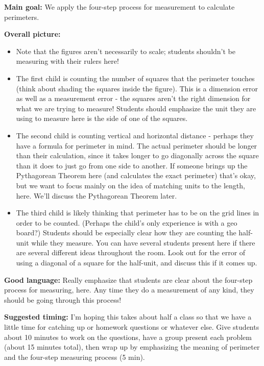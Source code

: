 \documentclass{ximera}
\begin{document}
\begin{instructorNotes}

{\bf Main goal:} We apply the four-step process for measurement to calculate perimeters.

{\bf Overall picture:} 
\begin{itemize}
	\item Note that the figures aren't necessarily to scale; students shouldn't be measuring with their rulers here!
	\item The first child is counting the number of squares that the perimeter touches (think about shading the squares inside the figure). This is a dimension error as well as a measurement error - the squares aren't the right dimension for what we are trying to measure! Students should emphasize the unit they are using to measure here is the side of one of the squares.
	\item The second child is counting vertical and horizontal distance - perhaps they have a formula for perimeter in mind. The actual perimeter should be longer than their calculation, since it takes longer to go diagonally across the square than it does to just go from one side to another. If someone brings up the Pythagorean Theorem here (and calculates the exact perimeter) that's okay, but we want to focus mainly on the idea of matching units to the length, here. We'll discuss the Pythagorean Theorem later.
	\item The third child is likely thinking that perimeter has to be on the grid lines in order to be counted. (Perhaps the child's only experience is with a geo board?) Students should be especially clear how they are counting the half-unit while they measure. You can have several students present here if there are several different ideas throughout the room. Look out for the error of using a diagonal of a square for the half-unit, and discuss this if it comes up.
\end{itemize}
 


{\bf Good language:} Really emphasize that students are clear about the four-step process for measuring, here. Any time they do a measurement of any kind, they should be going through this process!

{\bf Suggested timing:} I'm hoping this takes about half a class so that we have a little time for catching up or homework questions or whatever else. Give students about 10 minutes to work on the questions, have a group present each problem (about 15 minutes total), then wrap up by emphasizing the meaning of perimeter and the four-step measuring process (5 min).


\end{instructorNotes}
\end{document}
